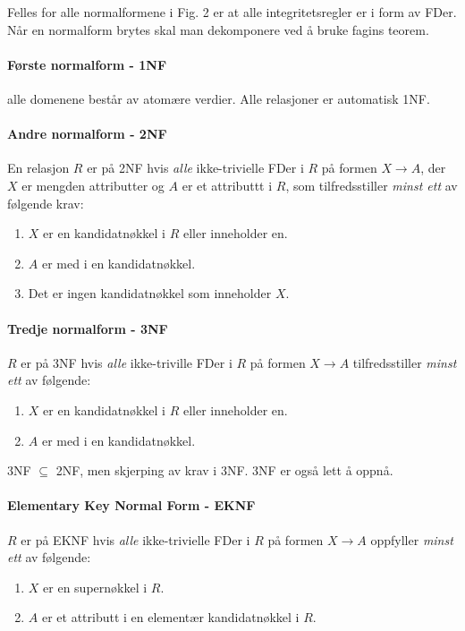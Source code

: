 \documentclass[12pt,a4paper]{article}
\begin{document}
Felles for alle normalformene i Fig. 2 er at alle integritetsregler er i form av FDer. Når en normalform brytes skal man dekomponere ved å bruke fagins teorem.

\paragraph{Første normalform - 1NF} alle domenene består av atomære verdier. Alle relasjoner er automatisk 1NF.

\paragraph{Andre normalform - 2NF} En relasjon $R$ er på 2NF hvis \textit{alle} ikke-trivielle FDer i $R$ på formen $X \rightarrow A$, der $X$ er mengden attributter og $A$ er et attributtt i $R$, som tilfredsstiller \textit{minst ett} av følgende krav:
\begin{enumerate}
\item{$X$ er en kandidatnøkkel i $R$ eller inneholder en.}
\item{$A$ er med i en kandidatnøkkel.}
\item{Det er ingen kandidatnøkkel som inneholder $X$.}
\end{enumerate}

\paragraph{Tredje normalform - 3NF} $R$ er på 3NF hvis \textit{alle} ikke-triville FDer i $R$ på formen $X \rightarrow A$ tilfredsstiller \textit{minst ett} av følgende:
\begin{enumerate}
\item{$X$ er en kandidatnøkkel i $R$ eller inneholder en.}
\item{$A$ er med i en kandidatnøkkel.}
\end{enumerate}

3NF $\subseteq$ 2NF, men skjerping av krav i 3NF. 3NF er også lett å oppnå.

\paragraph{Elementary Key Normal Form - EKNF} $R$ er på EKNF hvis \textit{alle} ikke-trivielle FDer i $R$ på formen $X \rightarrow A$ oppfyller \textit{minst ett} av følgende:
\begin{enumerate}
\item{$X$ er en supernøkkel i $R$.}
\item{$A$ er et attributt i en elementær kandidatnøkkel i $R$.}
\end{enumerate}
\end{document}
